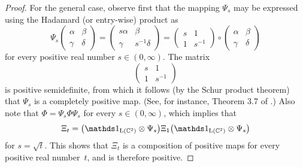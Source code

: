 \begin{proof}
  For the general case, observe first that the mapping $\Psi_s$ may be
  expressed using the Hadamard (or entry-wise) product as
  \begin{equation}
    \Psi_s
    \begin{pmatrix}
      \alpha & \beta \\
      \gamma & \delta
    \end{pmatrix}
    = 
    \begin{pmatrix}
      s \alpha & \beta \\
      \gamma & s^{-1} \delta
    \end{pmatrix}
    =
    \begin{pmatrix}
      s & 1\\
      1 & s^{-1}
    \end{pmatrix} \circ
    \begin{pmatrix}
      \alpha & \beta \\
      \gamma & \delta
    \end{pmatrix}
  \end{equation}
  for every positive real number $s\in(0,\infty)$.
  The matrix
  \begin{equation}
    \begin{pmatrix}
      s & 1\\
      1 & s^{-1}
    \end{pmatrix}
  \end{equation}
  is positive semidefinite, from which it follows (by the Schur product
  theorem) that $\Psi_s$ is a completely positive map.
  (See, for instance, Theorem 3.7 of \cite{Paulsen02}.)
  Also note that $\Phi = \Psi_s \Phi \Psi_s$ for every $s\in (0,\infty)$, which
  implies that
  \begin{equation}
    \Xi_t = \bigl(\I_{\Lin(\complex^2)} \otimes \Psi_s\bigr) \Xi_1
    \bigl(\I_{\Lin(\complex^2)} \otimes \Psi_s\bigr)
  \end{equation}
  for $s = \sqrt{t}$.
  This shows that $\Xi_t$ is a composition of positive maps for every positive
  real number~$t$, and is therefore positive.
\end{proof}

